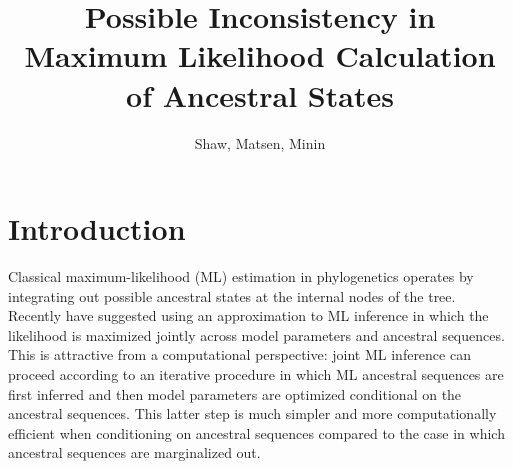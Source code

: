 \documentclass[a4paper]{article}
\title{Possible Inconsistency in Maximum Likelihood Calculation of Ancestral States}
\author{Shaw, Matsen, Minin}
\begin{document}
\maketitle


\renewcommand{\arraystretch}{1.2} %


\section*{Introduction}

Classical maximum-likelihood (ML) estimation in phylogenetics operates by integrating out possible ancestral states at the internal nodes of the tree.
Recently \cite{Neher2017} have suggested using an approximation to ML inference in which the likelihood is maximized jointly across model parameters and ancestral sequences.
This is attractive from a computational perspective: joint ML inference can proceed according to an iterative procedure in which ML ancestral sequences are first inferred and then model parameters are optimized conditional on the ancestral sequences.
This latter step is much simpler and more computationally efficient when conditioning on ancestral sequences compared to the case in which ancestral sequences are marginalized out.
\end{document}
